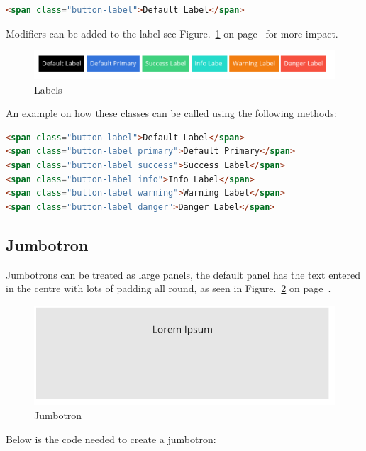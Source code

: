 \begin{lstlisting}[language=HTML]
<span class="button-label">Default Label</span>
\end{lstlisting}

Modifiers can be added to the label see Figure.~\ref{fig:label} on  page~\pageref{fig:label} for more impact.

\begin{figure}[h]
\centering
  \includegraphics[scale=0.5]{images/labels}
\caption{Labels}
  \label{fig:label}
\end{figure}


An example on how these classes can be called using the following methods: 

\begin{lstlisting}[language=HTML]
<span class="button-label">Default Label</span>
<span class="button-label primary">Default Primary</span>
<span class="button-label success">Success Label</span>
<span class="button-label info">Info Label</span>
<span class="button-label warning">Warning Label</span>
<span class="button-label danger">Danger Label</span>
\end{lstlisting}

\newpage
\subsection*{Jumbotron}
Jumbotrons can be treated as large panels, the default panel has the text entered in the centre with lots of padding all round, as seen in Figure.~\ref{fig:jumbo} on  page~\pageref{fig:jumbo}. 


\begin{figure}[h]
\centering
  \includegraphics[scale=0.4]{images/jumbrotron}
  \caption{Jumbotron}
  \label{fig:jumbo}
\end{figure}

Below is the code needed to create a jumbotron: 

